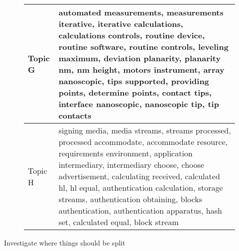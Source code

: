 \begin{figure}[!h]
\begin{center}
\begin{tabular}{|l l|}
Topic G  & automated measurements, measurements iterative, iterative calculations, calculations controls, routine device, routine software, routine controls, leveling maximum, deviation planarity, planarity nm, nm height, motors instrument, array nanoscopic, tips supported, providing points, determine points, contact tips, interface nanoscopic, nanoscopic tip, tip contacts \\ \hline
Topic H  & signing media, media streams, streams processed, processed accommodate, accommodate resource, requirements environment, application intermediary, intermediary choose, choose advertisement, calculating received, calculated hl, hl equal, authentication calculation, storage streams, authentication obtaining, blocks authentication, authentication apparatus, hash set, calculated equal, block stream \\ \hline
\end{tabular}
\end{center}
\end{figure}

Investigate where things should be split